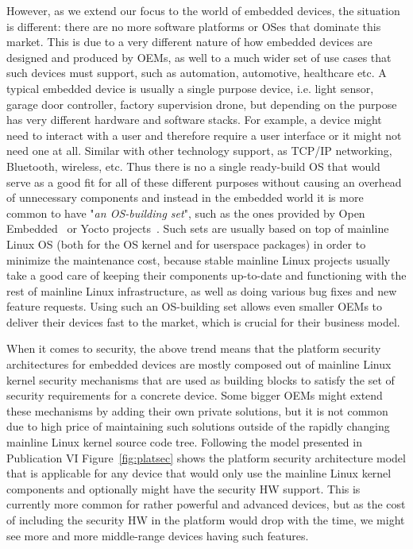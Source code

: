 However, as we extend our focus to the world of embedded devices, the situation is different: there are no more software platforms or OSes that dominate this market. This is due to a very different nature of how embedded devices are designed and produced by OEMs, as well to a much wider set of use cases that such devices must support, such as automation, automotive, healthcare etc. A typical embedded device is usually a single purpose device, i.e. light sensor, garage door controller, factory supervision drone, but depending on the purpose has very different hardware and software stacks. For example, a device might need to interact with a user and therefore require a user interface or it might not need one at all. Similar with other technology support, as TCP/IP networking, Bluetooth, wireless, etc. 
Thus there is no a single ready-build OS that would serve as a good fit for all of these different purposes without causing an overhead of unnecessary components and instead in the embedded world it is more common to have "\textit{an OS-building set}", such as the ones provided by Open Embedded~\cite{OE2017} or Yocto projects~\cite{yocto2017}. Such sets are usually based on top of mainline Linux OS (both for the OS kernel and for userspace packages) in order to minimize the maintenance cost, because stable mainline Linux projects usually take a good care of keeping their components up-to-date and functioning with the rest of mainline Linux infrastructure, as well as doing various bug fixes and new feature requests. Using such an OS-building set allows even smaller OEMs to deliver their devices fast to the market, which is crucial for their business model. 

When it comes to security, the above trend means that the platform security architectures for embedded devices are mostly composed out of mainline Linux kernel security mechanisms that are used as building blocks to satisfy the set of security requirements for a concrete device. Some bigger OEMs might extend these mechanisms by adding their own private solutions, but it is not common due to high price of maintaining such solutions outside of the rapidly changing mainline Linux kernel source code tree. Following the model presented in Publication VI Figure~\ref{fig:platsec} shows the platform security architecture model that is applicable for any device that would only use the mainline Linux kernel components and optionally might have the security HW support. This is currently more common for rather powerful and advanced devices, but as the cost of including the security HW in the platform would drop with the time, we might see more and more middle-range devices having such features. 

